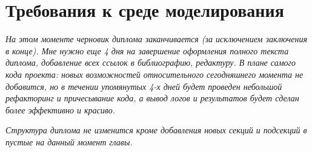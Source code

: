 \chapter{Требования к среде моделирования}

\textit{На этом моменте черновик диплома заканчивается (за исключением заключения в конце). Мне нужно еще 4 дня на завершение оформления полного текста диплома, добавление всех ссылок в библиографию, редактуру. В плане самого кода проекта: новых возможностей относительного сегодняшнего момента не добавится, но в течении упомянутых 4-х дней будет проведен небольшой рефакторинг и причесывание кода, а вывод логов и результатов будет сделан более эффективно и красиво.}

\textit{Структура диплома не изменится кроме добавления новых секций и подсекций в пустые на данный момент главы.}




